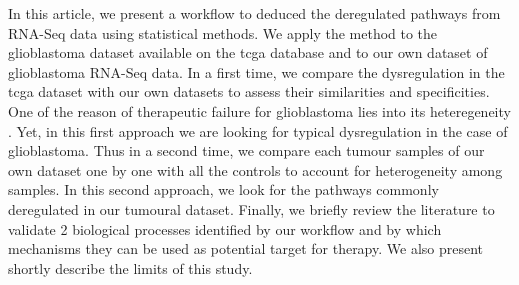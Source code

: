 In this article, we present a workflow to deduced the deregulated pathways from RNA-Seq data using statistical methods.
We apply the method to the glioblastoma dataset available on the \acrfull{tcga} database and to our own dataset of glioblastoma RNA-Seq data.
In a first time, we compare the dysregulation in the \acrshort{tcga} dataset with our own datasets to assess their similarities and specificities.
One of the reason of therapeutic failure for glioblastoma lies into its heteregeneity \cite*{Neftel2019}.
Yet, in this first approach we are looking for typical dysregulation in the case of glioblastoma.
Thus in a second time, we compare each tumour samples of our own dataset one by one with all the controls to account for heterogeneity among samples.
In this second approach, we look for the pathways commonly deregulated in our tumoural dataset.
Finally, we briefly review the literature to validate 2 biological processes identified by our workflow and by which mechanisms they can be used as potential target for therapy.
We also present shortly describe the limits of this study.
